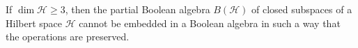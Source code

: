 If $\dim \mathcal{H} \geqslant 3$, then the partial Boolean algebra $B(\mathcal{H})$ of closed subspaces of a Hilbert space $\mathcal{H}$ cannot be embedded in a Boolean algebra in such a way that the operations are preserved.
